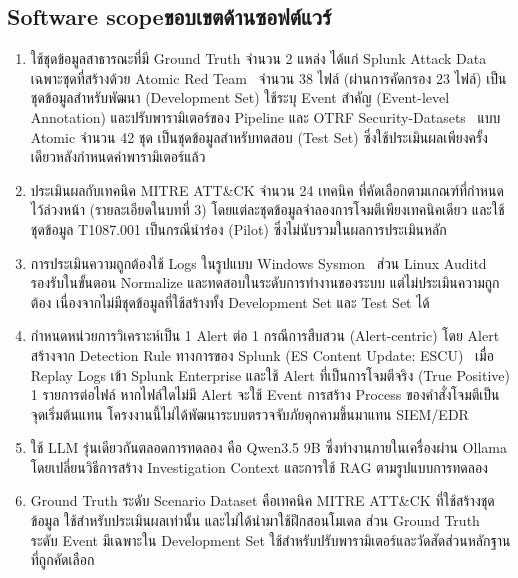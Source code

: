 \subsection{\ifenglish Software scope\else ขอบเขตด้านซอฟต์แวร์\fi}
\begin{enumerate}
    \item ใช้ชุดข้อมูลสาธารณะที่มี Ground Truth จำนวน 2 แหล่ง ได้แก่
          Splunk Attack Data~\cite{splunk-attack-data} เฉพาะชุดที่สร้างด้วย Atomic Red Team~\cite{atomic-red-team}
          จำนวน 38 ไฟล์ (ผ่านการคัดกรอง 23 ไฟล์) เป็นชุดข้อมูลสำหรับพัฒนา (Development Set)
          ใช้ระบุ Event สำคัญ (Event-level Annotation) และปรับพารามิเตอร์ของ Pipeline
          และ OTRF Security-Datasets~\cite{otrf-security-datasets} แบบ Atomic จำนวน 42 ชุด
          เป็นชุดข้อมูลสำหรับทดสอบ (Test Set) ซึ่งใช้ประเมินผลเพียงครั้งเดียวหลังกำหนดค่าพารามิเตอร์แล้ว

    \item ประเมินผลกับเทคนิค MITRE ATT\&CK จำนวน 24 เทคนิค ที่คัดเลือกตามเกณฑ์ที่กำหนดไว้ล่วงหน้า
          (รายละเอียดในบทที่ 3) โดยแต่ละชุดข้อมูลจำลองการโจมตีเพียงเทคนิคเดียว
          และใช้ชุดข้อมูล T1087.001 เป็นกรณีนำร่อง (Pilot) ซึ่งไม่นับรวมในผลการประเมินหลัก

    \item การประเมินความถูกต้องใช้ Logs ในรูปแบบ Windows Sysmon~\cite{sysmon}
          ส่วน Linux Auditd~\cite{auditd} รองรับในขั้นตอน Normalize และทดสอบในระดับการทำงานของระบบ
          แต่ไม่ประเมินความถูกต้อง เนื่องจากไม่มีชุดข้อมูลที่ใช้สร้างทั้ง Development Set และ Test Set ได้

    \item กำหนดหน่วยการวิเคราะห์เป็น 1 Alert ต่อ 1 กรณีการสืบสวน (Alert-centric)
          โดย Alert สร้างจาก Detection Rule ทางการของ Splunk (ES Content Update: ESCU)~\cite{splunk-escu}
          เมื่อ Replay Logs เข้า Splunk Enterprise และใช้ Alert ที่เป็นการโจมตีจริง (True Positive) 1 รายการต่อไฟล์
          หากไฟล์ใดไม่มี Alert จะใช้ Event การสร้าง Process ของคำสั่งโจมตีเป็นจุดเริ่มต้นแทน
          โครงงานนี้ไม่ได้พัฒนาระบบตรวจจับภัยคุกคามขึ้นมาแทน SIEM/EDR

    \item ใช้ LLM รุ่นเดียวกันตลอดการทดลอง คือ Qwen3.5 9B
          ซึ่งทำงานภายในเครื่องผ่าน Ollama โดยเปลี่ยนวิธีการสร้าง
          Investigation Context และการใช้ RAG ตามรูปแบบการทดลอง

    \item Ground Truth ระดับ Scenario Dataset คือเทคนิค MITRE ATT\&CK ที่ใช้สร้างชุดข้อมูล
          ใช้สำหรับประเมินผลเท่านั้น และไม่ได้นำมาใช้ฝึกสอนโมเดล
          ส่วน Ground Truth ระดับ Event มีเฉพาะใน Development Set
          ใช้สำหรับปรับพารามิเตอร์และวัดสัดส่วนหลักฐานที่ถูกคัดเลือก


\end{enumerate}
